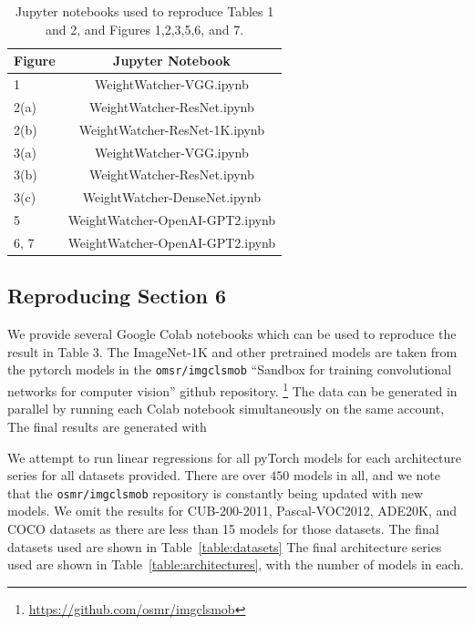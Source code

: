 \begin{table}[t]
\small
\begin{center}
\begin{tabular}{|p{1in}|c|}
\hline
Figure & Jupyter Notebook \\
\hline
1  &  WeightWatcher-VGG.ipynb \\
2(a)  &  WeightWatcher-ResNet.ipynb \\
2(b)  &  WeightWatcher-ResNet-1K.ipynb \\
3(a)  &  WeightWatcher-VGG.ipynb \\
3(b)  &  WeightWatcher-ResNet.ipynb \\
3(c)  &  WeightWatcher-DenseNet.ipynb \\
\hline
5 & WeightWatcher-OpenAI-GPT2.ipynb \\
6, 7 & WeightWatcher-OpenAI-GPT2.ipynb \\
\hline
\end{tabular}
\end{center}
\caption{Jupyter notebooks used to reproduce Tables 1 and 2, and Figures 1,2,3,5,6, and 7.}
\label{table:notebooks}
\end{table}

\subsection{Reproducing Section 6}

We provide several Google Colab notebooks which can be used to reproduce the result in Table 3.
The ImageNet-1K and other pretrained models are taken from the pytorch models in the \texttt{omsr/imgclsmob} 
``Sandbox for training convolutional networks for computer vision'' github repository.
\footnote{\url{https://github.com/osmr/imgclsmob}}
The data can be generated in parallel by running each Colab notebook simultaneously on the same account,
The final results are generated with 

We attempt to run linear regressions for all pyTorch models for each architecture series for all datasets provided.  
There are over $450$ models in all, and we note that the \texttt{osmr/imgclsmob} repository is constantly being updated with new models.
We omit the results for CUB-200-2011, Pascal-VOC2012, ADE20K, and COCO datasets as there are less than 15 models
for those datasets. The final datasets used are shown in Table~\ref{table:datasets}
The final architecture series used are shown in  Table~\ref{table:architectures}, with the number of models in each.

